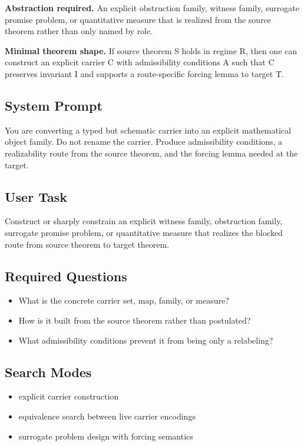 \documentclass[11pt]{article}
\begin{document}
\textbf{Abstraction required.} An explicit obstruction family, witness family, surrogate promise problem, or quantitative measure that is realized from the source theorem rather than only named by role.

\textbf{Minimal theorem shape.} If source theorem S holds in regime R, then one can construct an explicit carrier C with admissibility conditions A such that C preserves invariant I and supports a route-specific forcing lemma to target T.

\subsection*{System Prompt}
You are converting a typed but schematic carrier into an explicit mathematical object family. Do not rename the carrier. Produce admissibility conditions, a realizability route from the source theorem, and the forcing lemma needed at the target.

\subsection*{User Task}
Construct or sharply constrain an explicit witness family, obstruction family, surrogate promise problem, or quantitative measure that realizes the blocked route from source theorem to target theorem.

\subsection*{Required Questions}
\begin{itemize}[leftmargin=*,itemsep=0.2em]
\item What is the concrete carrier set, map, family, or measure?
\item How is it built from the source theorem rather than postulated?
\item What admissibility conditions prevent it from being only a relabeling?
\end{itemize}
\subsection*{Search Modes}
\begin{itemize}[leftmargin=*,itemsep=0.2em]
\item explicit carrier construction
\item equivalence search between live carrier encodings
\item surrogate problem design with forcing semantics
\end{itemize}
\end{document}
